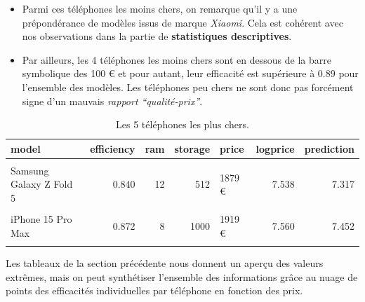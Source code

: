 \documentclass[
  12pt,
]{report}
\begin{document}
\begin{itemize}
\item
  Parmi ces téléphones les moins chers, on remarque qu'il y a une
  prépondérance de modèles issus de marque \emph{Xiaomi}. Cela est
  cohérent avec nos observations dans la partie de \textbf{statistiques
  descriptives}.
\item
  Par ailleurs, les 4 téléphones les moins chers sont en dessous de la
  barre symbolique des 100 € et pour autant, leur efficacité est
  supérieure à \(0.89\) pour l'ensemble des modèles. Les téléphones peu
  chers ne sont donc pas forcément signe d'un mauvais \emph{rapport
  ``qualité-prix''}.
\end{itemize}

\begin{table}[!h]
\centering
\caption{\label{tab:kbl_inexpensive}Les 5 téléphones les plus chers.}
\centering
\begin{tabular}[t]{lrrrlrr}
\toprule
\textbf{model} & \textbf{efficiency} & \textbf{ram} & \textbf{storage} & \textbf{price} & \textbf{logprice} & \textbf{prediction}\\
\midrule
\cellcolor{gray!10}{Samsung Galaxy S24 Ultra} & \cellcolor{gray!10}{0.861} & \cellcolor{gray!10}{12} & \cellcolor{gray!10}{1000} & \cellcolor{gray!10}{1829 €} & \cellcolor{gray!10}{7.512} & \cellcolor{gray!10}{7.361}\\
Samsung Galaxy Z Fold 5 & 0.840 & 12 & 512 & 1879 € & 7.538 & 7.317\\
\cellcolor{gray!10}{Samsung Galaxy Z Fold 5} & \cellcolor{gray!10}{0.811} & \cellcolor{gray!10}{12} & \cellcolor{gray!10}{512} & \cellcolor{gray!10}{1879 €} & \cellcolor{gray!10}{7.538} & \cellcolor{gray!10}{7.230}\\
iPhone 15 Pro Max & 0.872 & 8 & 1000 & 1919 € & 7.560 & 7.452\\
\cellcolor{gray!10}{HONOR V2} & \cellcolor{gray!10}{0.554} & \cellcolor{gray!10}{16} & \cellcolor{gray!10}{512} & \cellcolor{gray!10}{1999 €} & \cellcolor{gray!10}{7.600} & \cellcolor{gray!10}{6.636}\\
\bottomrule
\end{tabular}
\end{table}

\newpage

Les tableaux de la section précédente nous donnent un aperçu des valeurs
extrêmes, mais on peut synthétiser l'ensemble des informations grâce au
nuage de points des efficacités individuelles par téléphone en fonction
des prix.
\end{document}
